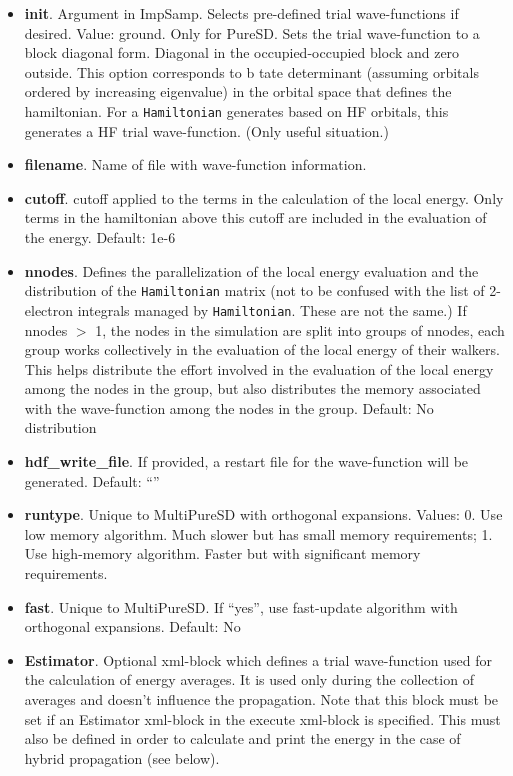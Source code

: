 \begin{itemize}
\item \textbf{init}. Argument in ImpSamp. Selects pre-defined trial wave-functions if desired. 
Value: ground. Only for PureSD. Sets the trial wave-function to a block diagonal form. Diagonal in the occupied-occupied block and zero outside. This option corresponds to b
tate determinant (assuming orbitals ordered by increasing eigenvalue) in the orbital space that defines the hamiltonian. For a \texttt{Hamiltonian} generates based on HF orbitals, this generates a HF trial wave-function. (Only useful situation.)
\item \textbf{filename}. Name of file with wave-function information.
\item \textbf{cutoff}. cutoff applied to the terms in the calculation of the local energy. Only terms in the hamiltonian above this cutoff are included in the evaluation of the energy.
      Default: 1e-6
\item \textbf{nnodes}. Defines the parallelization of the local energy evaluation and the distribution of the \texttt{Hamiltonian} matrix (not to be confused with the list of 2-electron integrals managed by \texttt{Hamiltonian}. These are not the same.) If nnodes $>$ 1, the nodes in the simulation are split into groups of nnodes, each group works collectively in the evaluation of the local energy of their walkers. This helps distribute the effort involved in the evaluation of the local energy among the nodes in the group, but also distributes the memory associated with the wave-function among the nodes in the group.
      Default: No distribution
\item \textbf{hdf\_write\_file}. If provided, a restart file for the wave-function will be generated.
      Default: ``''
\item \textbf{runtype}. Unique to MultiPureSD with orthogonal expansions.
      Values: 0.  Use low memory algorithm. Much slower but has small memory requirements;
      1. Use high-memory algorithm. Faster but with significant memory requirements.
\item \textbf{fast}. Unique to MultiPureSD. If ``yes'', use fast-update algorithm with orthogonal expansions.
      Default: No
\item \textbf{Estimator}. Optional xml-block which defines a trial wave-function used for the calculation of energy averages.  It is used only during the collection of averages and doesn't influence the propagation. Note that this block must be set if an Estimator xml-block in the execute xml-block is specified. This must also be defined in order to calculate and print the energy in the case of hybrid propagation (see below). \\
\end{itemize}

